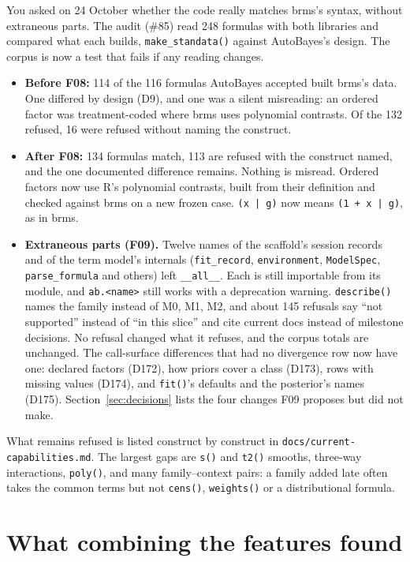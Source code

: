 \documentclass[11pt]{article}
\newcommand{\code}[1]{\texttt{#1}}
\newcommand{\file}[1]{\texttt{#1}}
\begin{document}
You asked on 24 October whether the code really matches brms's syntax, without extraneous parts. The audit (\#85) read 248
formulas with both libraries and compared what each builds, \code{make\_standata()} against AutoBayes's design. The
corpus is now a test that fails if any reading changes.
\begin{itemize}
\item \textbf{Before F08:} 114 of the 116 formulas AutoBayes accepted built brms's data. One differed by design (D9), and
  one was a silent misreading: an ordered factor was treatment-coded where brms uses polynomial contrasts. Of the 132
  refused, 16 were refused without naming the construct.
\item \textbf{After F08:} 134 formulas match, 113 are refused with the construct named, and the one documented difference
  remains. Nothing is misread. Ordered factors now use R's polynomial contrasts, built from their definition and checked
  against brms on a new frozen case. \code{(x | g)} now means \code{(1 + x | g)}, as in brms.
\item \textbf{Extraneous parts (F09).} Twelve names of the scaffold's session records and of the term model's internals (\code{fit\_record},
  \code{environment}, \code{ModelSpec}, \code{parse\_formula} and others) left \code{\_\_all\_\_}. Each is still
  importable from its module, and \code{ab.<name>} still works with a deprecation warning. \code{describe()} names the
  family instead of M0, M1, M2, and about 145 refusals say ``not supported'' instead of ``in this slice'' and cite current
  docs instead of milestone decisions. No refusal changed what it refuses, and the corpus totals are unchanged. The
  call-surface differences that had no divergence row now have one: declared factors (D172), how priors cover a class
  (D173), rows with missing values (D174), and \code{fit()}'s defaults and the posterior's names (D175).
  Section~\ref{sec:decisions} lists the four changes F09 proposes but did not make.
\end{itemize}
What remains refused is listed construct by construct in \file{docs/current-capabilities.md}. The largest gaps are
\code{s()} and \code{t2()} smooths, three-way interactions, \code{poly()}, and many family--context pairs: a family
added late often takes the common terms but not \code{cens()}, \code{weights()} or a distributional formula.

\section{What combining the features found}
\end{document}

